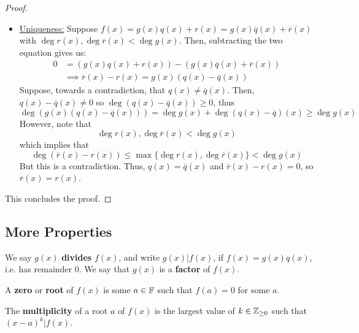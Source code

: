 \documentclass[letterpaper]{article}
\begin{document}
\begin{mdframed}[]
\begin{proof}
\begin{itemize}
            \item \underline{Uniqueness:} Suppose $f(x) = g(x) q(x) + r(x) = g(x) \overline{q}(x) + \overline{r}(x)$ with $\deg r(x), \deg \overline{r}(x) < \deg g(x)$. Then, subtracting the two equation gives us: 
            \begin{equation*}
                \begin{aligned}
                    0 &= (g(x)q(x) + r(x)) - (g(x) \overline{q}(x) + \overline{r}(x)) \\ 
                        &\implies \overline{r}(x) - r(x) = g(x)(q(x) - \overline{q}(x))
                \end{aligned}
            \end{equation*}
            Suppose, towards a contradiction, that $q(x) \neq \overline{q}(x)$. Then, $q(x) - \overline{q}(x) \neq 0$ so $\deg (q(x) - \overline{q}(x)) \geq 0$, thus 
            \[\deg (g(x)(q(x) - \overline{q}(x))) = \deg g(x) + \deg (q(x) - \overline{q})(x) \geq \deg g(x)\]
            However, note that 
            \[\deg r(x), \deg \overline{r}(x) < \deg g(x)\]
            which implies that 
            \[\deg(\overline{r}(x) - r(x)) \leq \max\{\deg r(x), \deg \overline{r}(x)\} < \deg g(x)\]
            But this is a contradiction. Thus, $q(x) = \overline{q}(x)$ and $\overline{r}(x) - r(x) = 0$, so $\overline{r}(x) = r(x)$. 
        \end{itemize}
        This concludes the proof.
    \end{proof}
\end{mdframed}


\subsection{More Properties}
\begin{definition}{}{}
    We say $g(x)$ \textbf{divides} $f(x)$, and write $g(x) | f(x)$, if $f(x) = g(x) q(x)$, i.e. has remainder 0. We say that $g(x)$ is a \textbf{factor} of $f(x)$.
\end{definition}

\begin{definition}{}{}
    A \textbf{zero} or \textbf{root} of $f(x)$ is some $a \in \mathbb{F}$ such that $f(a) = 0$ for some $a$. 
\end{definition}

\begin{definition}{}{}
    The \textbf{multiplicity} of a root $a$ of $f(x)$ is the largest value of $k \in \mathbb{Z}_{\geq 0}$ such that $(x - a)^k | f(x)$. 
\end{definition}
\end{document}
